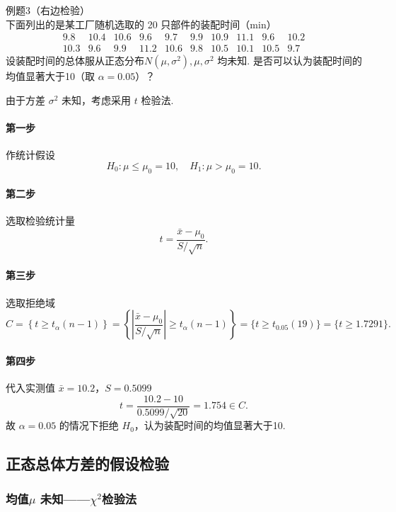 \begin{question}{例题3（右边检验）}
    下面列出的是某工厂随机选取的 20 只部件的装配时间（min）
    $$
        \begin{array}{cccccccccc}
            9.8  & 10.4 & 10.6 & 9.6  & 9.7  & 9.9 & 10.9 & 11.1 & 9.6  & 10.2 \\
            10.3 & 9.6  & 9.9  & 11.2 & 10.6 & 9.8 & 10.5 & 10.1 & 10.5 & 9.7
        \end{array}
    $$
    设装配时间的总体服从正态分布$N(\mu, \sigma^2), \mu, \sigma^2$ 均未知. 是否可以认为装配时间的均值显著大于10（取 $\alpha=0.05$）？
\end{question}
\begin{solution}
    由于方差 $\sigma^2$ 未知，考虑采用 $t$ 检验法.
    \paragraph{第一步} 作统计假设
    $$
        H_0: \mu \leqslant \mu_0 = 10, \quad H_1: \mu > \mu_0 = 10.
    $$
    \paragraph{第二步} 选取检验统计量
    $$
        t = \frac{\bar{x}-\mu_0}{S/\sqrt{n}} .
    $$
    \paragraph{第三步} 选取拒绝域
    $$
        C = \left\{t \geqslant t_{\alpha}(n-1)\right\}
        = \left\{\left|\frac{\bar{x}-\mu_0}{S/\sqrt{n}}\right| \geqslant t_{\alpha}(n-1)\right\}
        = \{t \geqslant t_{0.05}(19)\}
        = \{t \geqslant 1.7291\}.
    $$
    \paragraph{第四步} 代入实测值 $\bar{x}=10.2$，$S=0.5099$
    $$
        t = \frac{10.2-10}{0.5099/\sqrt{20}} = 1.754 \in C.
    $$
    故 $\alpha = 0.05$ 的情况下拒绝 $H_0$，认为装配时间的均值显著大于10.
\end{solution}


\subsection{正态总体方差的假设检验}

\subsubsection{均值\texorpdfstring{$\mu$}{μ} 未知——\texorpdfstring{$\chi^2$}{x²}检验法}

